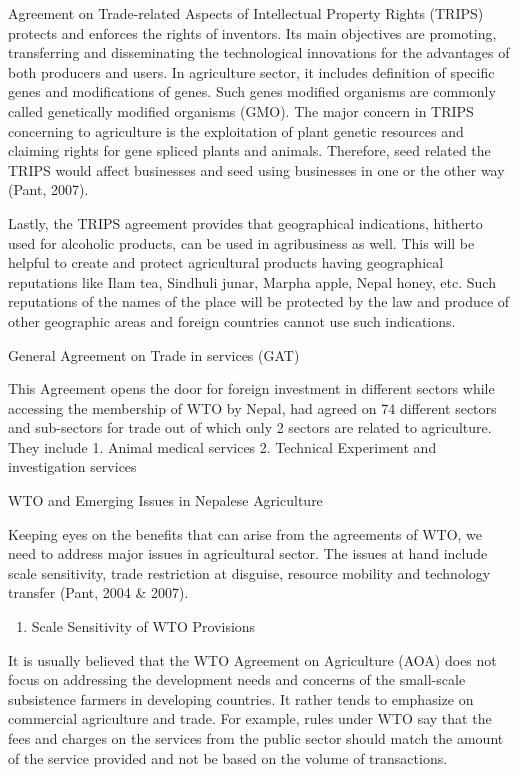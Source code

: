 \documentclass[
]{book}
\providecommand{\tightlist}{%
  \setlength{\itemsep}{0pt}\setlength{\parskip}{0pt}}
\begin{document}
Agreement on Trade-related Aspects of Intellectual Property Rights (TRIPS) protects and enforces the rights of inventors. Its main objectives are promoting, transferring and disseminating the technological innovations for the advantages of both producers and users. In agriculture sector, it includes definition of specific genes and modifications of genes. Such genes modified organisms are commonly called genetically modified organisms (GMO). The major concern in TRIPS concerning to agriculture is the exploitation of plant genetic resources and claiming rights for gene spliced plants and animals. Therefore, seed related the TRIPS would affect businesses and seed using businesses in one or the other way (Pant, 2007).

Lastly, the TRIPS agreement provides that geographical indications, hitherto used for alcoholic products, can be used in agribusiness as well. This will be helpful to create and protect agricultural products having geographical reputations like Ilam tea, Sindhuli junar, Marpha apple, Nepal honey, etc. Such reputations of the names of the place will be protected by the law and produce of other geographic areas and foreign countries cannot use such indications.

General Agreement on Trade in services (GAT)

This Agreement opens the door for foreign investment in different sectors while accessing the membership of WTO by Nepal, had agreed on 74 different sectors and sub-sectors for trade out of which only 2 sectors are related to agriculture. They include
1. Animal medical services
2. Technical Experiment and investigation services

WTO and Emerging Issues in Nepalese Agriculture

Keeping eyes on the benefits that can arise from the agreements of WTO, we need to address major issues in agricultural sector. The issues at hand include scale sensitivity, trade restriction at disguise, resource mobility and technology transfer (Pant, 2004 \& 2007).

\begin{enumerate}
\def\labelenumi{\arabic{enumi}.}
\tightlist
\item
  Scale Sensitivity of WTO Provisions
\end{enumerate}

It is usually believed that the WTO Agreement on Agriculture (AOA) does not focus on addressing the development needs and concerns of the small-scale subsistence farmers in developing countries. It rather tends to emphasize on commercial agriculture and trade. For example, rules under WTO say that the fees and charges on the services from the public sector should match the amount of the service provided and not be based on the volume of transactions.
\end{document}
